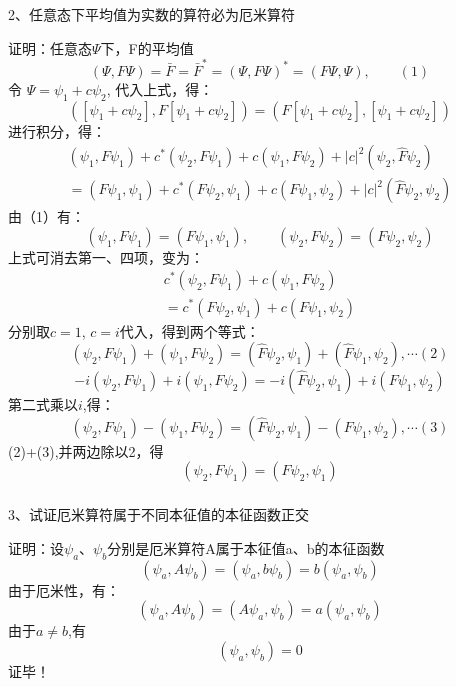 \begin{frame} [allowframebreaks=]
    \frametitle{}
    \begin{exampleblock}{}
        2、任意态下平均值为实数的算符必为厄米算符
    \end{exampleblock}
    \alert{证明：}任意态$\Psi$下，F的平均值
    $$(\Psi,F\Psi)=\bar{F}=\bar{F}^*=(\Psi,F\Psi)^*=(F\Psi,\Psi), \qquad (1) $$
    令 $\Psi= \psi_1+c\psi_2 $, 代入上式，得：
    $$([\psi_1+c\psi_2],F [\psi_1+c\psi_2])=(F[\psi_1+c\psi_2],[\psi_1+c\psi_2]) $$
    进行积分，得：
    $$
    \begin{array}{r}
    \left(\psi_{1}, F \psi_{1}\right)+c^{*}\left(\psi_{2}, F \psi_{1}\right)+c\left(\psi_{1}, F \psi_{2}\right)+|c|^{2}\left(\psi_{2}, \hat{F} \psi_{2}\right) \\
    =\left(F \psi_{1}, \psi_{1}\right)+c^{*}\left(F \psi_{2}, \psi_{1}\right)+c\left(F \psi_{1}, \psi_{2}\right)+|c|^{2}\left(\hat{F} \psi_{2}, \psi_{2}\right)
    \end{array}
    $$
    由（1）有： 
    $$(\psi_1,F\psi_1)=(F \psi_1, \psi_1), \qquad (\psi_2,F\psi_2)=(F \psi_2, \psi_2) $$
    上式可消去第一、四项，变为：
    $$\begin{array}{r}
        c^{*}\left(\psi_{2}, F \psi_{1}\right)+c\left(\psi_{1}, F \psi_{2}\right) \\
        =c^{*}\left(F \psi_{2}, \psi_{1}\right)+c\left(F \psi_{1}, \psi_{2}\right)
    \end{array}$$
    分别取$c=1$, $c=i$代入，得到两个等式：
    $$  \left(\psi_{2}, F \psi_{1}\right)+\left(\psi_{1}, F \psi_{2}\right) = 
    \left(\hat{F} \psi_{2}, \psi_{1}\right)+\left(\hat{F} \psi_{1}, \psi_{2}\right) , \cdots (2)
    $$
    $$
    -i\left(\psi_{2}, F \psi_{1}\right)+i\left(\psi_{1}, F \psi_{2}\right) 
    =-i\left(\hat{F} \psi_{2}, \psi_{1}\right)+i\left(F \psi_{1}, \psi_{2}\right)
    $$
    第二式乘以$i$,得：
    $$
    \left(\psi_{2}, F \psi_{1}\right)-\left(\psi_{1}, F \psi_{2}\right) 
    =\left(\hat{F} \psi_{2}, \psi_{1}\right)-\left(F \psi_{1}, \psi_{2}\right), \cdots (3)
    $$
    (2)+(3),并两边除以2，得
    $$
    \left(\psi_{2}, F \psi_{1}\right) =\left(F \psi_{2}, \psi_{1}\right)
    $$
\end{frame} 
\begin{frame} [allowframebreaks=]
    \frametitle{}
    \begin{exampleblock}{}
        3、试证厄米算符属于不同本征值的本征函数正交
    \end{exampleblock}
    \alert{证明：}设$\psi_a$、$\psi_b$分别是厄米算符A属于本征值a、b的本征函数
    \begin{equation*}
        (\psi_a, A\psi_b)=(\psi_a, b\psi_b)=b(\psi_a, \psi_b)
    \end{equation*}  
    由于厄米性，有：
    \begin{equation*}
        (\psi_a, A\psi_b)=(A\psi_a, \psi_b)=a(\psi_a, \psi_b)
    \end{equation*}
    由于$a\neq b$,有
    \begin{equation*}
        (\psi_a, \psi_b)=0
    \end{equation*}
   证毕！
\end{frame} 

